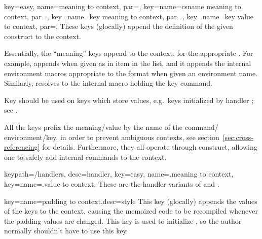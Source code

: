 \documentclass[a4paper,11pt]{article}
\begin{document}
\begin{doc}{
    key={easy, name=meaning to context,
      par=},
    key={name=csname meaning to context, par=},
    key={name=key meaning to context,
      par=},
    key={name=key value to context,
      par=},
  }
  These keys (glocally) append the definition of the given construct to the
  context.

  Essentially, the ``meaning'' keys append 
  to the context, for the appropriate .  For example,
   appends  when given 
  as in item in the list, and it appends the internal environment macros
  appropriate to the format when given an environment name.  Similarly,
   resolves  to the
  internal macro holding the key command.

  Key  should be used on keys which store values,
  e.g.\ keys initialized by  handler ; see
  .

  All the keys prefix the meaning\slash value by the name of the command\slash
  environment\slash key, in order to prevent ambiguous contexts, see
  section~\ref{sec:cross-referencing} for details.  Furthermore, they all
  operate through  construct, allowing one
  to safely add internal commands to the context.
\end{doc}

\begin{doc}{
    keypath={/handlers}, desc=handler,
    key={easy, name=.meaning to context},
    key={name=.value to context},
  }
  These are the handler variants of  and
  .
\end{doc}


\begin{doc}{key={name=padding to context,desc=style}}
  This key (glocally) appends the values of the  keys to the
  context, causing the memoized code to be recompiled whenever the padding
  values are changed.  This key is used to initialize , so the
  author normally shouldn't have to use this key.
\end{doc}
\end{document}
